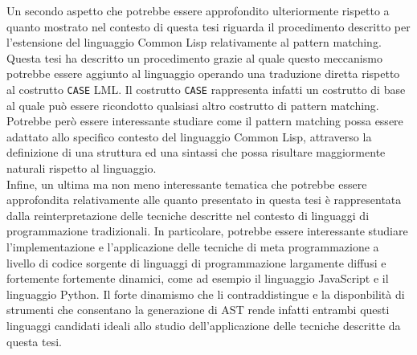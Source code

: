 \documentclass{book}
\begin{document}
Un secondo aspetto che potrebbe essere approfondito ulteriormente rispetto a
quanto mostrato nel contesto di questa tesi riguarda il procedimento descritto
per l'estensione del linguaggio Common Lisp relativamente al pattern matching.
Questa tesi ha descritto un procedimento grazie al quale questo meccanismo
potrebbe essere aggiunto al linguaggio operando una traduzione diretta rispetto
al costrutto \texttt{CASE} LML. Il costrutto \texttt{CASE} rappresenta infatti
un costrutto di base al quale può essere ricondotto qualsiasi altro costrutto di
pattern matching. Potrebbe però essere interessante studiare come il pattern
matching possa essere adattato allo specifico contesto del linguaggio Common
Lisp, attraverso la definizione di una struttura ed una sintassi che possa
risultare maggiormente naturali rispetto al linguaggio.\\

Infine, un ultima ma non meno interessante tematica che potrebbe essere
approfondita relativamente alle quanto presentato in questa tesi è rappresentata
dalla reinterpretazione delle tecniche descritte nel contesto di linguaggi di
programmazione tradizionali. In particolare, potrebbe essere interessante
studiare l'implementazione e l'applicazione delle tecniche di meta
programmazione a livello di codice sorgente di linguaggi di programmazione
largamente diffusi e fortemente fortemente dinamici, come ad esempio il
linguaggio JavaScript e il linguaggio Python. Il forte dinamismo che li
contraddistingue e la disponbilità di strumenti che consentano la generazione di
AST rende infatti entrambi questi linguaggi candidati ideali allo studio
dell'applicazione delle tecniche descritte da questa tesi.

\printbibliography[filter=papers,title={Articoli Citati}]
\printbibliography[type=book,title={Bibliografia}]
\printbibliography[type=misc,title={Sitografia}]
\end{document}
